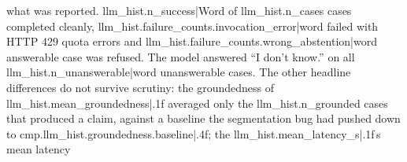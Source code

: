 what was reported. {{llm_hist.n_success|Word}} of {{llm_hist.n_cases}} cases completed cleanly, {{llm_hist.failure_counts.invocation_error|word}} failed with
HTTP 429 quota errors and {{llm_hist.failure_counts.wrong_abstention|word}} answerable case was refused. The model
answered ``I don't know.'' on all {{llm_hist.n_unanswerable|word}} unanswerable cases. The other
headline differences do not survive scrutiny: the groundedness of {{llm_hist.mean_groundedness|.1f}}
averaged only the {{llm_hist.n_grounded}} cases that produced a claim, against a baseline the
segmentation bug had pushed down to {{cmp.llm_hist.groundedness.baseline|.4f}}; the {{llm_hist.mean_latency_s|.1f}}\,s mean latency
